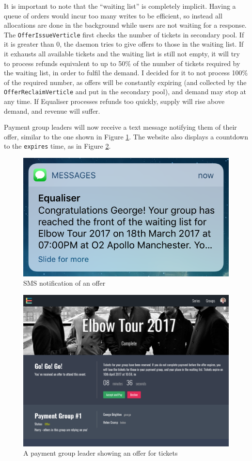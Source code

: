 \documentclass[12pt,a4paper]{bhamdissertation}
\newcommand{\code}[1]{\texttt{#1}}
\begin{document}
It is important to note that the ``waiting list'' is completely implicit. Having a queue of orders would incur too many writes to be efficient, so instead all allocations are done in the background while users are not waiting for a response. The \code{OfferIssueVerticle} first checks the number of tickets in secondary pool. If it is greater than 0, the daemon tries to give offers to those in the waiting list. If it exhausts all available tickets and the waiting list is still not empty, it will try to process refunds equivalent to up to 50\% of the number of tickets required by the waiting list, in order to fulfil the demand. I decided for it to not process 100\% of the required number, as offers will be constantly expiring (and collected by the \code{OfferReclaimVerticle} and put in the secondary pool), and demand may stop at any time. If Equaliser processes refunds too quickly, supply will rise above demand, and revenue will suffer.

Payment group leaders will now receive a text message notifying them of their offer, similar to the one shown in Figure \ref{img:offer_notification}. The website also displays a countdown to the \code{expires} time, as in Figure \ref{img:offer}.

\begin{figure}[!htbp]
    \centering
    \includegraphics[width=.5\linewidth]{img/offer_notification.png}
    \caption{SMS notification of an offer}
    \label{img:offer_notification}
\end{figure}

\begin{figure}[!htbp]
    \centering
    \includegraphics[width=1\linewidth]{img/offer.png}
    \caption{A payment group leader showing an offer for tickets}
    \label{img:offer}
\end{figure}
\end{document}
